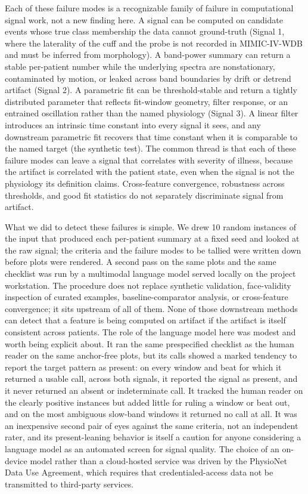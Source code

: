 \documentclass[twocolumn,letterpaper,10pt]{article}
\begin{document}
Each of these failure modes is a recognizable family of failure in computational signal work, not a new finding here. A signal can be computed on candidate events whose true class membership the data cannot ground-truth (Signal 1, where the laterality of the cuff and the probe is not recorded in MIMIC-IV-WDB and must be inferred from morphology). A band-power summary can return a stable per-patient number while the underlying spectra are nonstationary, contaminated by motion, or leaked across band boundaries by drift or detrend artifact (Signal 2). A parametric fit can be threshold-stable and return a tightly distributed parameter that reflects fit-window geometry, filter response, or an entrained oscillation rather than the named physiology (Signal 3). A linear filter introduces an intrinsic time constant into every signal it sees, and any downstream parametric fit recovers that time constant when it is comparable to the named target (the synthetic test). The common thread is that each of these failure modes can leave a signal that correlates with severity of illness, because the artifact is correlated with the patient state, even when the signal is not the physiology its definition claims. Cross-feature convergence, robustness across thresholds, and good fit statistics do not separately discriminate signal from artifact.

What we did to detect these failures is simple. We drew 10 random instances of the input that produced each per-patient summary at a fixed seed and looked at the raw signal; the criteria and the failure modes to be tallied were written down before plots were rendered. A second pass on the same plots and the same checklist was run by a multimodal language model served locally on the project workstation. The procedure does not replace synthetic validation, face-validity inspection of curated examples, baseline-comparator analysis, or cross-feature convergence; it sits upstream of all of them. None of those downstream methods can detect that a feature is being computed on artifact if the artifact is itself consistent across patients. The role of the language model here was modest and worth being explicit about. It ran the same prespecified checklist as the human reader on the same anchor-free plots, but its calls showed a marked tendency to report the target pattern as present: on every window and beat for which it returned a usable call, across both signals, it reported the signal as present, and it never returned an absent or indeterminate call. It tracked the human reader on the clearly positive instances but added little for ruling a window or beat out, and on the most ambiguous slow-band windows it returned no call at all. It was an inexpensive second pair of eyes against the same criteria, not an independent rater, and its present-leaning behavior is itself a caution for anyone considering a language model as an automated screen for signal quality. The choice of an on-device model rather than a cloud-hosted service was driven by the PhysioNet Data Use Agreement, which requires that credentialed-access data not be transmitted to third-party services.
\end{document}
